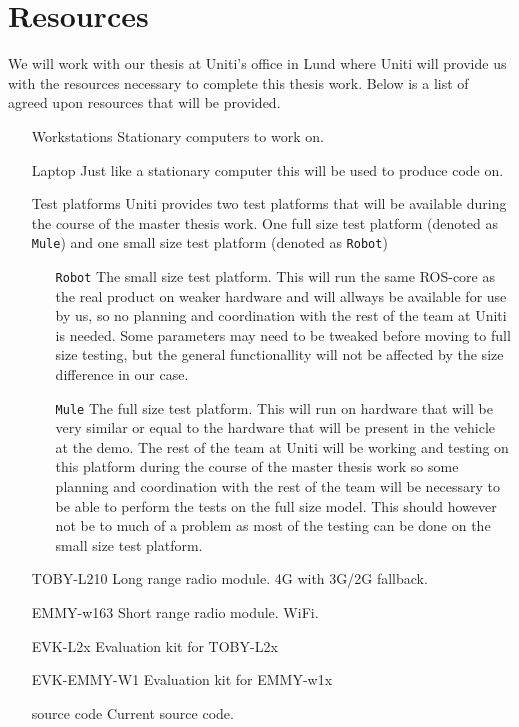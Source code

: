 \documentclass[a4paper]{article}
\begin{document}
\section{Resources}



We will work with our thesis at Uniti's office in Lund where Uniti will provide
us with the resources necessary to complete this thesis work. Below is a list of
agreed upon resources that will be provided.

\begin{itemize}
	\item[Workstations] Stationary computers to work on.
	\item[Laptop] Just like a stationary computer this will be used to produce
		code on.
	\item[Test platforms] Uniti provides two test platforms that will be available
		during the course of the master thesis work. One full size test platform
		(denoted as \texttt{Mule}) and one small size test platform (denoted as
		\texttt{Robot})
		\begin{itemize}
			\item[\texttt{Robot}] The small size test platform. This will run the same
				ROS-core as the real product on weaker hardware and will allways be
				available for use by us, so no planning and coordination with the rest
				of the team at Uniti is needed. Some parameters may need to be tweaked
				before moving to full size testing, but the general functionallity will
				not be affected by the size difference in our case.
			\item[\texttt{Mule}] The full size test platform. This will run on
				hardware that will be very similar or equal to the hardware that will be
				present in the vehicle at the demo. The rest of the team at Uniti will
				be working and testing on this platform during the course of the master
				thesis work so some planning and coordination with the rest of the team
				will be necessary to be able to perform the tests on the full size
				model. This should however not be to much of a problem as most of the
				testing can be done on the small size test platform.
		\end{itemize}
	\item[TOBY-L210] Long range radio module. 4G with 3G/2G fallback.
	\item[EMMY-w163] Short range radio module. WiFi.
	\item[EVK-L2x] Evaluation kit for TOBY-L2x
	\item[EVK-EMMY-W1] Evaluation kit for EMMY-w1x
	\item[source code] Current source code.

\end{itemize}
\end{document}
